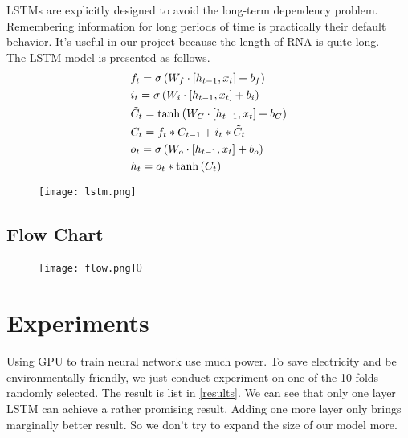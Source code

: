 \documentclass[paper=a4, fontsize=11pt] {scrartcl} %
\numberwithin{equation}{section} %
\numberwithin{figure}{section} %
\numberwithin{table}{section} %
\begin{document}
LSTMs are explicitly designed to avoid the long-term dependency problem. Remembering information for long periods of time is practically their default behavior. It's useful in our project because the length of RNA is quite long. \\

The LSTM model is  presented as follows.\\

\[\begin{gathered}
  {f_t} = \sigma \left( {{W_f} \cdot \left[ {{h_{t - 1}},{x_t}} \right] + {b_f}} \right) \hfill \\
  {i_t} = \sigma \left( {{W_i} \cdot \left[ {{h_{t - 1}},{x_t}} \right] + {b_i}} \right) \hfill \\
  {{\tilde C}_t} = \tanh \left( {{W_C} \cdot \left[ {{h_{t - 1}},{x_t}} \right] + {b_C}} \right) \hfill \\
  {C_t} = {f_t} * {C_{t - 1}} + {i_t} * {{\tilde C}_t} \hfill \\
  {o_t} = \sigma \left( {{W_o} \cdot \left[ {{h_{t - 1}},{x_t}} \right] + {b_o}} \right) \hfill \\
  {h_t} = {o_t} * \tanh \left( {{C_t}} \right) \hfill \\ 
\end{gathered} \]

	\begin{figure}[htbp]
	\centering
	\texttt{[image: lstm.png]}
	\end{figure}
	
\subsection{Flow Chart}
	\begin{figure}[htbp]
	\centering
	\texttt{[image: flow.png]}0
	\end{figure}




\section{Experiments}

Using GPU to train neural network use much power. To save electricity and be environmentally friendly, we just conduct experiment on one of the 10 folds randomly selected. The result is list in \ref{results}. We can see that only one layer LSTM can achieve a rather promising result. Adding one more layer only brings marginally better result. So we don't try to expand the size of our model more. 
\end{document}

